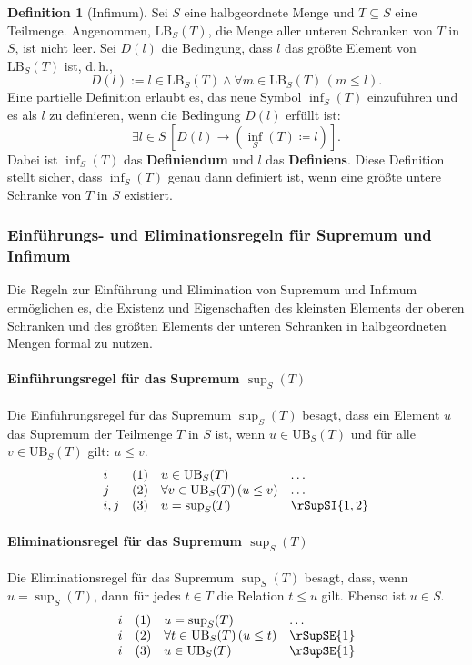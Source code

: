 \documentclass{book}
\theoremstyle{plain}
\theoremstyle{remark}
\theoremstyle{definition}
\newtheorem{definition}{Definition}[section]
\begin{document}
\begin{definition}[Infimum]
    Sei \( S \) eine halbgeordnete Menge und \( T \subseteq S \) eine Teilmenge. Angenommen, \(\text{LB}_S(T)\), die Menge aller unteren Schranken von \( T \) in \( S \), ist nicht leer. Sei \( D(l) \) die Bedingung, dass \( l \) das größte Element von \(\text{LB}_S(T)\) ist, d.\,h.,
    \[
    D(l) := l \in \text{LB}_S(T) \land \forall m \in \text{LB}_S(T) \, (m \leq l).
    \]
    Eine partielle Definition erlaubt es, das neue Symbol \(\inf_S(T)\) einzuführen und es als \( l \) zu definieren, wenn die Bedingung \( D(l) \) erfüllt ist:
    \[
    \exists l \in S \, [ D(l) \rightarrow (\inf_S(T) \coloneqq l) ].
    \]
    Dabei ist \(\inf_S(T)\) das \textbf{Definiendum} und \( l \) das \textbf{Definiens}. Diese Definition stellt sicher, dass \(\inf_S(T)\) genau dann definiert ist, wenn eine größte untere Schranke von \( T \) in \( S \) existiert.
\end{definition}

\subsubsection{Einführungs- und Eliminationsregeln für Supremum und Infimum}
\label{rule:rSupSI} \label{rule:rSupSE} \label{rule:rInfSI} \label{rule:rInfSE}

Die Regeln zur Einführung und Elimination von Supremum und Infimum ermöglichen es, die Existenz und Eigenschaften des kleinsten Elements der oberen Schranken und des größten Elements der unteren Schranken in halbgeordneten Mengen formal zu nutzen.

\paragraph{Einführungsregel für das Supremum \(\sup_S(T)\)}
Die Einführungsregel für das Supremum \(\sup_S(T)\) besagt, dass ein Element \( u \) das Supremum der Teilmenge \( T \) in \( S \) ist, wenn \( u \in \text{UB}_S(T) \) und für alle \( v \in \text{UB}_S(T) \) gilt: \( u \leq v \).
\[
\begin{array}{llll}
    i   & (1) & u \in \text{UB}_S(T) & \dots \\
    j   & (2) & \forall v \in \text{UB}_S(T) \, (u \leq v) & \dots \\
    i,j & (3) & u = \sup_S(T) & \rSupSI{1,2}
\end{array}
\]

\paragraph{Eliminationsregel für das Supremum \(\sup_S(T)\)}
Die Eliminationsregel für das Supremum \(\sup_S(T)\) besagt, dass, wenn \( u = \sup_S(T) \), dann für jedes \( t \in T \) die Relation \( t \leq u \) gilt. Ebenso ist \( u \in S \).
\[
\begin{array}{llll}
    i & (1) & u = \sup_S(T) & \dots \\
    i & (2) & \forall t \in \text{UB}_S(T) \, (u \leq t) & \rSupSE{1} \\
    i & (3) & u \in \text{UB}_S(T) & \rSupSE{1}
\end{array}
\]
\end{document}
